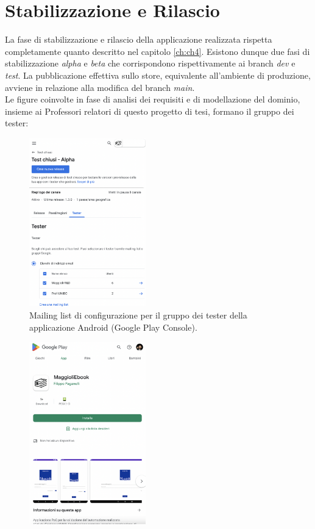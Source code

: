 \section{Stabilizzazione e Rilascio}
La fase di stabilizzazione e rilascio della applicazione realizzata rispetta completamente quanto descritto nel capitolo \ref{ch:ch4}. Esistono dunque due fasi di stabilizzazione \textit{alpha} e \textit{beta} che corrispondono rispettivamente ai branch \textit{dev} e \textit{test}. La pubblicazione effettiva sullo store, equivalente all'ambiente di produzione, avviene in relazione alla modifica del branch \textit{main}.\\
Le figure coinvolte in fase di analisi dei requisiti e di modellazione del dominio, insieme ai Professori relatori di questo progetto di tesi, formano il gruppo dei tester:
\begin{multicols}{2}
    \begin{figure}[H]
\centering
    \includegraphics[width=0.45\textwidth]{img/Screenshot 2022-09-28 at 14.41.54.png}
    \caption{Mailing list di configurazione per il gruppo dei tester della applicazione Android (Google Play Console).}
    \label{mailinglisttester}
\end{figure}
\begin{figure}[H]
\centering
    \includegraphics[width=0.45\textwidth]{img/Screenshot 2022-09-28 at 15.06.56.png}

\end{figure}
\end{multicols}
